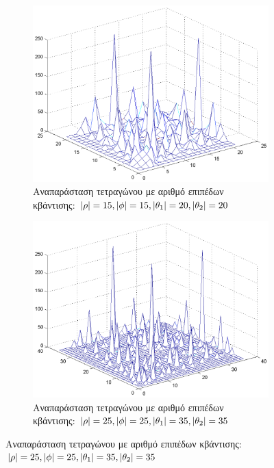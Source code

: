 \begin{figure}
        \centering
        \begin{subfigure}[b]{1\textwidth}
                \centerline{\includegraphics[scale = 0.35]{./images/examples/smallerTetragwno(15152020).png}}
                \caption{Αναπαράσταση τετραγώνου με αριθμό επιπέδων κβάντισης: $\lvert\rho\rvert = 15,\lvert\phi\rvert = 15,\lvert\theta_1\rvert = 20,\lvert\theta_2\rvert = 20$}
        \end{subfigure}

        \centering
        \begin{subfigure}[b]{1\textwidth}
                \centerline{\includegraphics[scale = 0.35]{./images/examples/smallerTetragwno(25253535).png}}
                \caption{Αναπαράσταση τετραγώνου με αριθμό επιπέδων κβάντισης: $\lvert\rho\rvert = 25,\lvert\phi\rvert = 25,\lvert\theta_1\rvert = 35,\lvert\theta_2\rvert = 35$}
        \end{subfigure}
\end{figure}
